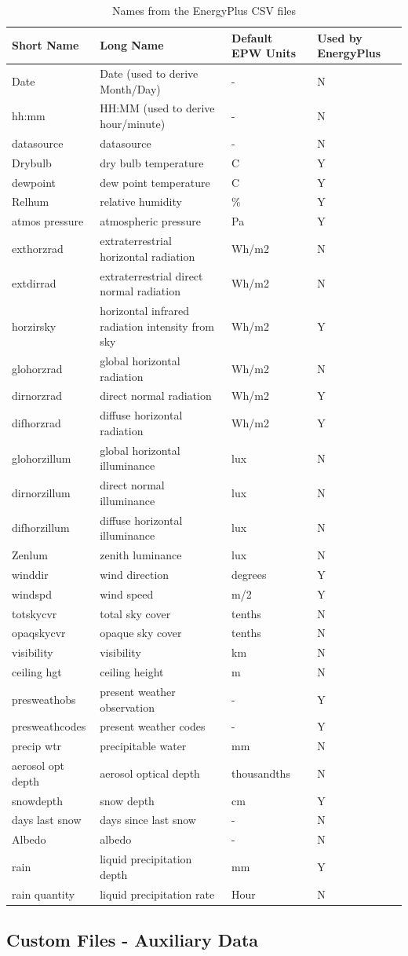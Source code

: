 \begin{longtable}[c]{p{1.5in}p{1.5in}p{1.5in}p{1.5in}}
\caption{Names from the EnergyPlus CSV files \protect \label{table:names-from-the-energyplus-csv-files}}\\
\toprule 
Short Name & Long Name & Default EPW Units & Used by EnergyPlus \tabularnewline \midrule
\endhead
Date & Date (used to derive Month/Day) & - & N \tabularnewline
hh:mm & HH:MM (used to derive hour/minute) & - & N \tabularnewline
datasource & datasource & - & N \tabularnewline
Drybulb & dry bulb temperature & C & Y \tabularnewline
dewpoint & dew point temperature & C & Y \tabularnewline
Relhum & relative humidity & \% & Y \tabularnewline
atmos pressure & atmospheric pressure & Pa & Y \tabularnewline
exthorzrad & extraterrestrial horizontal radiation & Wh/m2 & N \tabularnewline
extdirrad & extraterrestrial direct normal radiation & Wh/m2 & N \tabularnewline
horzirsky & horizontal infrared radiation intensity from sky & Wh/m2 & Y \tabularnewline
glohorzrad & global horizontal radiation & Wh/m2 & N \tabularnewline
dirnorzrad & direct normal radiation & Wh/m2 & Y \tabularnewline
difhorzrad & diffuse horizontal radiation & Wh/m2 & Y \tabularnewline
glohorzillum & global horizontal illuminance & lux & N \tabularnewline
dirnorzillum & direct normal illuminance & lux & N \tabularnewline
difhorzillum & diffuse horizontal illuminance & lux & N \tabularnewline
Zenlum & zenith luminance & lux & N \tabularnewline
winddir & wind direction & degrees & Y \tabularnewline
windspd & wind speed & m/2 & Y \tabularnewline
totskycvr & total sky cover & tenths & N \tabularnewline
opaqskycvr & opaque sky cover & tenths & N \tabularnewline
visibility & visibility & km & N \tabularnewline
ceiling hgt & ceiling height & m & N \tabularnewline
presweathobs & present weather observation & - & Y \tabularnewline
presweathcodes & present weather codes & - & Y \tabularnewline
precip wtr & precipitable water & mm & N \tabularnewline
aerosol opt depth & aerosol optical depth & thousandths & N \tabularnewline
snowdepth & snow depth & cm & Y \tabularnewline
days last snow & days since last snow & - & N \tabularnewline
Albedo & albedo & - & N \tabularnewline
rain & liquid precipitation depth & mm & Y \tabularnewline
rain quantity & liquid precipitation rate & Hour & N \tabularnewline
\bottomrule
\end{longtable}

\subsection{Custom Files - Auxiliary Data}\label{custom-files---auxiliary-data}

